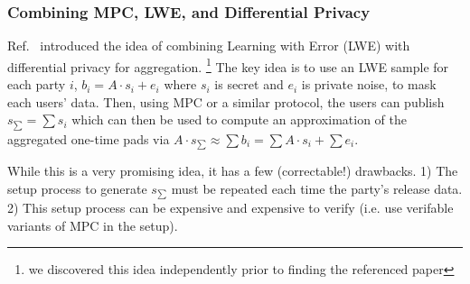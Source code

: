 \subsubsection*{Combining MPC, LWE, and Differential Privacy}
Ref.~\cite{stevens2021efficientdifferentiallyprivatesecure} introduced the idea of combining Learning with Error (LWE) with differential privacy for aggregation.
\footnote{we discovered this idea independently prior to finding the referenced paper}
The key idea is to use an LWE sample for each party $i$, $b_i = A \cdot s_i + e_i$ where $s_i$ is secret and $e_i$ is private noise, to mask each users' data.
Then, using MPC or a similar protocol, the users can publish $s_{\sum} = \sum s_i$ which can then be used to compute an approximation of the aggregated one-time pads via $A \cdot s_{\sum} \approx \sum b_i = \sum A \cdot s_i + \sum e_i$.

While this is a very promising idea, it has a few (correctable!) drawbacks.
1) The setup process to generate $s_{\sum}$ must be repeated each time the party's release data.
2) This setup process can be expensive and expensive to verify (i.e. use verifable variants of MPC in the setup).


